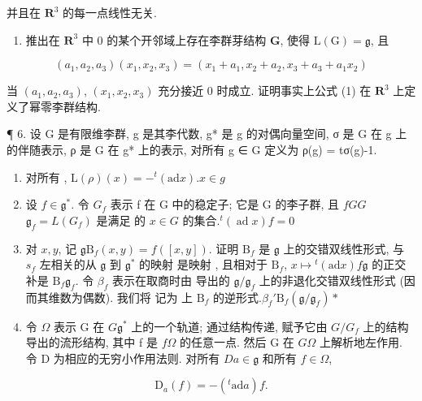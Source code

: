 并且在 \(\mathbf{R}^3\) 的每一点线性无关.

\begin{enumerate}
\def\labelenumi{(\alph{enumi})}
\setcounter{enumi}{1}
\tightlist
\item
  推出在 \(\mathbf{R}^3\) 中 0 的某个开邻域上存在李群芽结构 \(\mathbf{G}\), 使得 \(\mathrm{L}(\mathrm{G}) = \mathfrak{g}\), 且
\end{enumerate}

\[
(a _ {1}, a _ {2}, a _ {3}) (x _ {1}, x _ {2}, x _ {3}) = (x _ {1} + a _ {1}, x _ {2} + a _ {2}, x _ {3} + a _ {3} + a _ {1} x _ {2})\tag{1}
\]

当 \((a_{1}, a_{2}, a_{3})\), \((x_{1}, x_{2}, x_{3})\) 充分接近 0 时成立. 证明事实上公式 (1) 在 \(\mathbf{R}^{3}\) 上定义了幂零李群结构.

¶ 6. 设 G 是有限维李群, g 是其李代数, g* 是 g 的对偶向量空间, σ 是 G 在 g 上的伴随表示, ρ 是 G 在 g* 上的表示, 对所有 g ∈ G 定义为 ρ(g) = tσ(g)-1.

\begin{enumerate}
\def\labelenumi{(\alph{enumi})}
\item
  对所有 , \(\mathrm{L}(\rho)(x) = -^{t}(\mathrm{ad} x)\).\(x \in g\)
\item
  设 \(f \in \mathfrak{g}^*\). 令 \(G_f\) 表示 f 在 G 中的稳定子; 它是 G 的李子群, 且 \(f\)\(G\)\(G\)\(\mathfrak{g}_f = L(G_f)\) 是满足  的 \(x \in G\) 的集合.\({}^t (\operatorname{ad}x)f = 0\)
\item
  对 \(x, y\), 记 \(\mathfrak{g}\)\(\mathrm{B}_f(x, y) = f([x, y])\). 证明 \(\mathrm{B}_f\) 是 \(\mathfrak{g}\) 上的交错双线性形式, 与 \(s_f\) 左相关的从 \(\mathfrak{g}\) 到 \(\mathfrak{g}^*\) 的映射  是映射  , 且相对于 \(\mathrm{B}_f\), \(x \mapsto {}^t (\mathrm{ad}x)\)\(f\)\(\mathfrak{g}\) 的正交补是 \(\mathrm{B}_f\)\(\mathfrak{g}_f\). 令 \(\beta_f\) 表示在取商时由  导出的 \(\mathfrak{g} / \mathfrak{g}_f\) 上的非退化交错双线性形式 (因而其维数为偶数). 我们将  记为  上 \(\mathrm{B}_f\) 的逆形式.\(\beta_f'\)\(\mathrm{B}_f\)\((\mathfrak{g} / \mathfrak{g}_f)*\)
\item
  令 \(\Omega\) 表示 G 在 \(G\)\(\mathfrak{g}^*\) 上的一个轨道; 通过结构传递, 赋予它由 \(G / G_f\) 上的结构导出的流形结构, 其中 f 是 \(f\)\(\Omega\) 的任意一点. 然后 G 在 \(G\)\(\Omega\) 上解析地左作用. 令 D 为相应的无穷小作用法则. 对所有 \(D\)\(a \in \mathfrak{g}\) 和所有 \(f \in \Omega\),
\end{enumerate}

\[
\mathrm{D} _ {a} (f) = - (^ {t} \mathrm{ad} a) f.
\]

